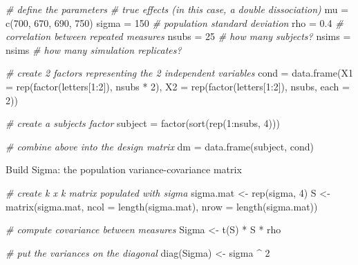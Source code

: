 \documentclass[
]{book}
\newenvironment{Shaded}{\begin{snugshade}}{\end{snugshade}}
\newcommand{\AttributeTok}[1]{\textcolor[rgb]{0.77,0.63,0.00}{#1}}
\newcommand{\CommentTok}[1]{\textcolor[rgb]{0.56,0.35,0.01}{\textit{#1}}}
\newcommand{\DecValTok}[1]{\textcolor[rgb]{0.00,0.00,0.81}{#1}}
\newcommand{\FloatTok}[1]{\textcolor[rgb]{0.00,0.00,0.81}{#1}}
\newcommand{\FunctionTok}[1]{\textcolor[rgb]{0.00,0.00,0.00}{#1}}
\newcommand{\NormalTok}[1]{#1}
\newcommand{\OtherTok}[1]{\textcolor[rgb]{0.56,0.35,0.01}{#1}}
\newcommand{\SpecialCharTok}[1]{\textcolor[rgb]{0.00,0.00,0.00}{#1}}
\begin{document}
\begin{Shaded}
\begin{Highlighting}[]
\CommentTok{\# define the parameters}
\CommentTok{\# true effects (in this case, a double dissociation)}
\NormalTok{mu }\OtherTok{=} \FunctionTok{c}\NormalTok{(}\DecValTok{700}\NormalTok{, }\DecValTok{670}\NormalTok{, }\DecValTok{690}\NormalTok{, }\DecValTok{750}\NormalTok{) }
\NormalTok{sigma }\OtherTok{=} \DecValTok{150}  \CommentTok{\# population standard deviation}
\NormalTok{rho }\OtherTok{=} \FloatTok{0.4} \CommentTok{\# correlation between repeated measures}
\NormalTok{nsubs }\OtherTok{=} \DecValTok{25} \CommentTok{\# how many subjects?}
\NormalTok{nsims }\OtherTok{=}\NormalTok{ nsims }\CommentTok{\# how many simulation replicates?}
 
\CommentTok{\# create 2 factors representing the 2 independent variables}
\NormalTok{cond }\OtherTok{=} \FunctionTok{data.frame}\NormalTok{(}\AttributeTok{X1 =} \FunctionTok{rep}\NormalTok{(}\FunctionTok{factor}\NormalTok{(letters[}\DecValTok{1}\SpecialCharTok{:}\DecValTok{2}\NormalTok{]), nsubs }\SpecialCharTok{*} \DecValTok{2}\NormalTok{),}
\AttributeTok{X2 =} \FunctionTok{rep}\NormalTok{(}\FunctionTok{factor}\NormalTok{(letters[}\DecValTok{1}\SpecialCharTok{:}\DecValTok{2}\NormalTok{]), nsubs, }\AttributeTok{each =} \DecValTok{2}\NormalTok{))}
 
\CommentTok{\# create a subjects factor}
\NormalTok{subject }\OtherTok{=} \FunctionTok{factor}\NormalTok{(}\FunctionTok{sort}\NormalTok{(}\FunctionTok{rep}\NormalTok{(}\DecValTok{1}\SpecialCharTok{:}\NormalTok{nsubs, }\DecValTok{4}\NormalTok{)))}
 
\CommentTok{\# combine above into the design matrix}
\NormalTok{dm }\OtherTok{=} \FunctionTok{data.frame}\NormalTok{(subject, cond)}
\end{Highlighting}
\end{Shaded}

Build Sigma: the population variance-covariance matrix

\begin{Shaded}
\begin{Highlighting}[]
\CommentTok{\# create k x k matrix populated with sigma}
\NormalTok{sigma.mat }\OtherTok{\textless{}{-}} \FunctionTok{rep}\NormalTok{(sigma, }\DecValTok{4}\NormalTok{)}
\NormalTok{S }\OtherTok{\textless{}{-}}
\FunctionTok{matrix}\NormalTok{(sigma.mat,}
\AttributeTok{ncol =} \FunctionTok{length}\NormalTok{(sigma.mat),}
\AttributeTok{nrow =} \FunctionTok{length}\NormalTok{(sigma.mat))}

\CommentTok{\# compute covariance between measures}
\NormalTok{Sigma }\OtherTok{\textless{}{-}} \FunctionTok{t}\NormalTok{(S) }\SpecialCharTok{*}\NormalTok{ S }\SpecialCharTok{*}\NormalTok{ rho}

\CommentTok{\# put the variances on the diagonal}
\FunctionTok{diag}\NormalTok{(Sigma) }\OtherTok{\textless{}{-}}\NormalTok{ sigma }\SpecialCharTok{\^{}} \DecValTok{2}  
\end{Highlighting}
\end{Shaded}
\end{document}
